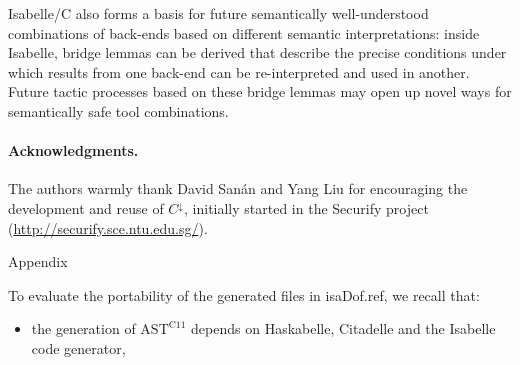 \begin{isabellebody}
\begin{isamarkuptext}
Isabelle/C also forms a basis for future semantically well-understood combinations of back-ends 
based on different semantic interpretations: inside Isabelle, bridge lemmas can be derived 
that describe the precise conditions under which results from one back-end can be re-interpreted
and used in another. Future tactic processes based on these bridge lemmas may open up novel ways 
for semantically safe tool combinations.%
\end{isamarkuptext}\isamarkuptrue%
%
\paragraph*{Acknowledgments.}
\begin{isamarkuptext}%
The authors warmly thank David Sanán and Yang Liu for encouraging the development and reuse of
$C^\downarrow$, initially started in the Securify project \cite{DBLP:conf/tacas/SananZHZTL17}
(\url{http://securify.sce.ntu.edu.sg/}).
\end{isamarkuptext}\isamarkuptrue%
%
\begin{isamarkupsection*}%
[label = {appendix},type = {scholarly_paper.technical}, args={label = {appendix},type = {scholarly_paper.technical}, Isa_COL.text_element.level = {}, Isa_COL.text_element.referentiable = {False}, Isa_COL.text_element.variants = {{STR ''outline'', STR ''document''}}, scholarly_paper.text_section.main_author = {}, scholarly_paper.text_section.fixme_list = {}, Isa_COL.text_element.level = {}, scholarly_paper.technical.definition_list = {}}]Appendix%
\end{isamarkupsection*}\isamarkuptrue%
%
\isadelimdocument
%
\endisadelimdocument
%
\isatagdocument
%
\isamarkuptrue%
%
\endisatagdocument
{\isafolddocument}%
%
\isadelimdocument
%
\endisadelimdocument
%
\begin{isamarkuptext}%
To evaluate the portability of the generated files in \csname isaDof.ref, we recall that:

%
\begin{itemize}%
\item the generation of $\text{AST}^{\text{C11}}$ depends on Haskabelle, Citadelle and the
Isabelle code generator,


\end{itemize}
\end{isamarkuptext}
\end{isabellebody}
